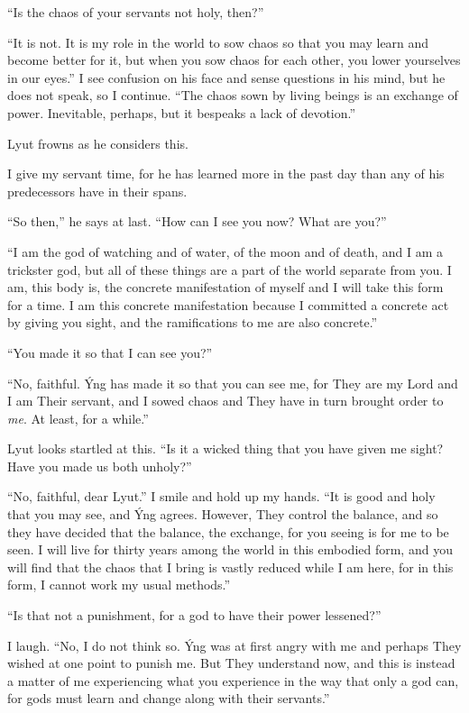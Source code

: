 ``Is the chaos of your servants not holy, then?''

``It is not. It is my role in the world to sow chaos so that you may learn and become better for it, but when you sow chaos for each other, you lower yourselves in our eyes.'' I see confusion on his face and sense questions in his mind, but he does not speak, so I continue. ``The chaos sown by living beings is an exchange of power. Inevitable, perhaps, but it bespeaks a lack of devotion.''

Lyut frowns as he considers this.

I give my servant time, for he has learned more in the past day than any of his predecessors have in their spans.

``So then,'' he says at last. ``How can I see you now? What are you?''

``I am the god of watching and of water, of the moon and of death, and I am a trickster god, but all of these things are a part of the world separate from you. I am, this body is, the concrete manifestation of myself and I will take this form for a time. I am this concrete manifestation because I committed a concrete act by giving you sight, and the ramifications to me are also concrete.''

``You made it so that I can see you?''

``No, faithful. Ýng has made it so that you can see me, for They are my Lord and I am Their servant, and I sowed chaos and They have in turn brought order to \emph{me}. At least, for a while.''

Lyut looks startled at this. ``Is it a wicked thing that you have given me sight? Have you made us both unholy?''

``No, faithful, dear Lyut.'' I smile and hold up my hands. ``It is good and holy that you may see, and Ýng agrees. However, They control the balance, and so they have decided that the balance, the exchange, for you seeing is for me to be seen. I will live for thirty years among the world in this embodied form, and you will find that the chaos that I bring is vastly reduced while I am here, for in this form, I cannot work my usual methods.''

``Is that not a punishment, for a god to have their power lessened?''

I laugh. ``No, I do not think so. Ýng was at first angry with me and perhaps They wished at one point to punish me. But They understand now, and this is instead a matter of me experiencing what you experience in the way that only a god can, for gods must learn and change along with their servants.''

